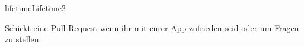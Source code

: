 \documentclass[parskip=half, final]{scrreprt}
\begin{document}
\begin{lecture}
\begin{exc}
\begin{excitem}{lifetime}{Lifetime}{2}
\begin{enumerate}
Schickt eine Pull-Request wenn ihr mit eurer App zufrieden seid oder um Fragen zu stellen.

\end{enumerate}

\end{excitem}

\end{exc}


\end{lecture}
\end{document}
